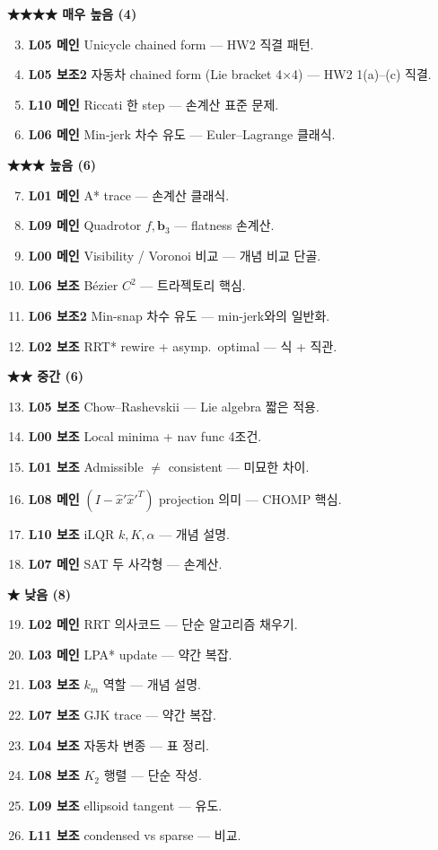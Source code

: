 \documentclass[11pt,a4paper]{article}
\begin{document}
\textbf{★★★★ 매우 높음 (4)}
\begin{enumerate}\setcounter{enumi}{2}
  \item \textbf{L05 메인} Unicycle chained form --- HW2 직결 패턴.
  \item \textbf{L05 보조2} 자동차 chained form (Lie bracket 4×4) --- HW2 1(a)--(c) 직결.
  \item \textbf{L10 메인} Riccati 한 step --- 손계산 표준 문제.
  \item \textbf{L06 메인} Min-jerk 차수 유도 --- Euler--Lagrange 클래식.
\end{enumerate}

\textbf{★★★ 높음 (6)}
\begin{enumerate}\setcounter{enumi}{6}
  \item \textbf{L01 메인} A* trace --- 손계산 클래식.
  \item \textbf{L09 메인} Quadrotor $f, \mathbf{b}_3$ --- flatness 손계산.
  \item \textbf{L00 메인} Visibility / Voronoi 비교 --- 개념 비교 단골.
  \item \textbf{L06 보조} Bézier $C^2$ --- 트라젝토리 핵심.
  \item \textbf{L06 보조2} Min-snap 차수 유도 --- min-jerk와의 일반화.
  \item \textbf{L02 보조} RRT* rewire + asymp.\ optimal --- 식 + 직관.
\end{enumerate}

\textbf{★★ 중간 (6)}
\begin{enumerate}\setcounter{enumi}{12}
  \item \textbf{L05 보조} Chow--Rashevskii --- Lie algebra 짧은 적용.
  \item \textbf{L00 보조} Local minima + nav func 4조건.
  \item \textbf{L01 보조} Admissible $\neq$ consistent --- 미묘한 차이.
  \item \textbf{L08 메인} $(I-\hat x'\hat x'^T)$ projection 의미 --- CHOMP 핵심.
  \item \textbf{L10 보조} iLQR $k, K, \alpha$ --- 개념 설명.
  \item \textbf{L07 메인} SAT 두 사각형 --- 손계산.
\end{enumerate}

\textbf{★ 낮음 (8)}
\begin{enumerate}\setcounter{enumi}{18}
  \item \textbf{L02 메인} RRT 의사코드 --- 단순 알고리즘 채우기.
  \item \textbf{L03 메인} LPA* update --- 약간 복잡.
  \item \textbf{L03 보조} $k_m$ 역할 --- 개념 설명.
  \item \textbf{L07 보조} GJK trace --- 약간 복잡.
  \item \textbf{L04 보조} 자동차 변종 --- 표 정리.
  \item \textbf{L08 보조} $K_2$ 행렬 --- 단순 작성.
  \item \textbf{L09 보조} ellipsoid tangent --- 유도.
  \item \textbf{L11 보조} condensed vs sparse --- 비교.
\end{enumerate}
\end{document}
